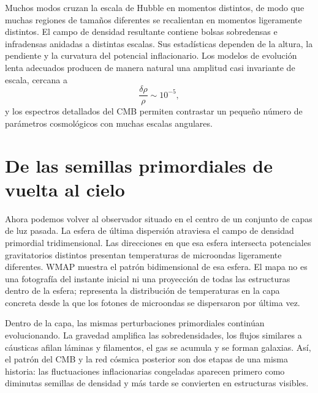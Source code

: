 Muchos modos cruzan la escala de Hubble en momentos distintos, de modo que muchas regiones de tamaños diferentes se recalientan en momentos ligeramente distintos. El campo de densidad resultante contiene bolsas sobredensas e infradensas anidadas a distintas escalas. Sus estadísticas dependen de la altura, la pendiente y la curvatura del potencial inflacionario. Los modelos de evolución lenta adecuados producen de manera natural una amplitud casi invariante de escala, cercana a
\[
\frac{\delta\rho}{\rho}\sim10^{-5},
\]
y los espectros detallados del CMB permiten contrastar un pequeño número de parámetros cosmológicos con muchas escalas angulares.

\section{De las semillas primordiales de vuelta al cielo}

Ahora podemos volver al observador situado en el centro de un conjunto de capas de luz pasada. La esfera de última dispersión atraviesa el campo de densidad primordial tridimensional. Las direcciones en que esa esfera intersecta potenciales gravitatorios distintos presentan temperaturas de microondas ligeramente diferentes. WMAP muestra el patrón bidimensional de esa esfera. El mapa no es una fotografía del instante inicial ni una proyección de todas las estructuras dentro de la esfera; representa la distribución de temperaturas en la capa concreta desde la que los fotones de microondas se dispersaron por última vez.

Dentro de la capa, las mismas perturbaciones primordiales continúan evolucionando. La gravedad amplifica las sobredensidades, los flujos similares a cáusticas afilan láminas y filamentos, el gas se acumula y se forman galaxias. Así, el patrón del CMB y la red cósmica posterior son dos etapas de una misma historia: las fluctuaciones inflacionarias congeladas aparecen primero como diminutas semillas de densidad y más tarde se convierten en estructuras visibles.

\begin{classroomqa}
\end{classroomqa}

